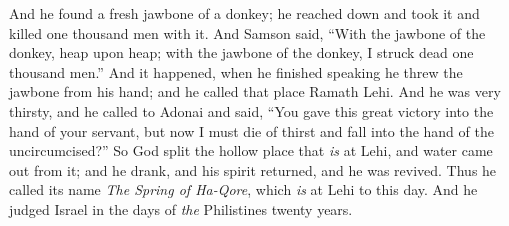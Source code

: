 \begin{biblechapter}
\verse And he found a fresh jawbone of a donkey; he reached down and took it and killed one thousand men with it.
\verse And Samson said, “With the jawbone of the donkey, 
heap upon heap; 
with the jawbone of the donkey, 
I struck dead one thousand men.”
\verse And it happened, when he finished speaking he threw the jawbone from his hand; and he called that place Ramath Lehi.
\verse And he was very thirsty, and he called to Adonai and said, “You gave this great victory into the hand of your servant, but now I must die of thirst and fall into the hand of the uncircumcised?”
\verse So God split the hollow place that \textit{is} at Lehi, and water came out from it; and he drank, and his spirit returned, and he was revived. Thus he called its name \textit{The Spring of Ha-Qore}, which \textit{is} at Lehi to this day.
\verse And he judged Israel in the days of \textit{the} Philistines twenty years.
\end{biblechapter}

